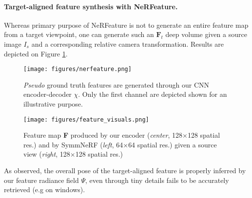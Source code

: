 \paragraph{Target-aligned feature synthesis with NeRFeature.} 
Whereas primary purpose of NeRFeature is not to generate an entire feature map from a target viewpoint, one can generate such an $\mathbf{F}_{t}$ deep volume given a source image $I_{s}$ and a corresponding relative camera transformation. Results are depicted on Figure \ref{fig:nerfeature_prediction}. 

\begin{figure*}[htb!]
  \centering
  \begin{subfigure}[t]{0.45\linewidth}
    \texttt{[image: figures/nerfeature.png]}
    \caption{\textit{Pseudo} ground truth features are generated through our CNN encoder-decoder $\chi$. Only the first channel are depicted shown for an illustrative purpose.}
    \label{fig:nerfeature_prediction}
  \end{subfigure}
  \hfill
  \begin{subfigure}[t]{0.51\linewidth}
    \texttt{[image: figures/feature\_visuals.png]}
    \caption{Feature map \textbf{F} produced by our encoder (\textit{center}, 128$\times$128 spatial res.) and by SymmNeRF (\textit{left}, 64$\times$64 spatial res.) given a source view (\textit{right}, 128$\times$128 spatial res.)}
    \label{fig:featuremap_comparison}
  \end{subfigure}
  \caption{Feature map respectively observed from a target - NeRFeature $\Psi$, \ref{fig:nerfeature_prediction} - and source - CNN $\chi$, \ref{fig:featuremap_comparison} - viewpoint perspective. }
  \label{fig:short}
\end{figure*}

As observed, the overall pose of the target-aligned feature is properly inferred by our feature radiance field $\Psi$, even through tiny details fails to be accurately retrieved (e.g on windows). 

